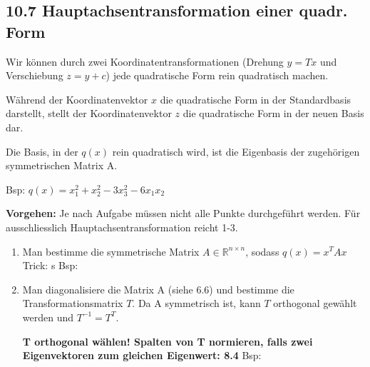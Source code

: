 \subsection{10.7 Hauptachsentransformation einer quadr. Form}{
\vskip1pt
Wir können durch zwei Koordinatentransformationen (Drehung $y =  T x$ und Verschiebung $z = y + c$) jede quadratische Form rein quadratisch machen. \par 
\vskip2pt
Während der Koordinatenvektor $x$ die quadratische Form in der Standardbasis darstellt, stellt der Koordinatenvektor $z$ die quadratische Form in der neuen Basis dar. \par
\vskip2pt
Die Basis, in der $q(x)$ rein quadratisch wird, ist die Eigenbasis der zugehörigen symmetrischen Matrix A.

\vspace{0pt}
\begin{center}Bsp: $q(x) = x_1^2 + x_2^2 - 3 x_3^2 - 6 x_1x_2$ \end{center}
\vspace{0pt}

\textbf{Vorgehen:} \vskip1pt
Je nach Aufgabe müssen nicht alle Punkte durchgeführt werden. Für ausschliesslich Hauptachsentransformation reicht 1-3.
\vskip3pt

\begin{enumerate}[label=\protect\circled{\arabic*}]
\item Man bestimme die symmetrische Matrix $A \in \mathbb{R}^{n\times n}$, sodass $q(x) = x^T A x$\vskip2sp
Trick: \hskip3pt \scalebox{0.8}{$ax_1^2 + b x_1x_2 + c x_2^2 \hskip3pt \Rightarrow \hskip3pt A =  \begin{pmatrix}a & b/2 \\ b/2 & c \end{pmatrix}$}s
\vskip2pt Bsp: \scalebox{0.8}{\hskip8pt$A = \begin{pmatrix}1 & -3 & 0 \\ -3 & 1 & 0 \\ 0 & 0 & -3 \end{pmatrix}$} \par

\item Man diagonalisiere die Matrix A (siehe 6.6) und bestimme die Transformationsmatrix $T$. Da A symmetrisch ist, kann $T$ orthogonal gewählt werden und $T^{-1} = T^T$. \par \textbf{T orthogonal wählen! Spalten von T normieren, falls zwei Eigenvektoren zum gleichen Eigenwert: 8.4}
\vskip2pt Bsp: 


\end{enumerate}}
